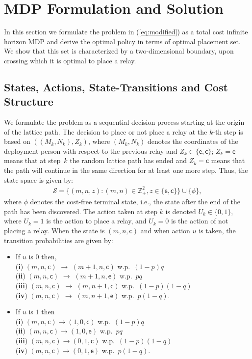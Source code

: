 \documentclass[conference]{IEEEtran}
\begin{document}
\section{MDP Formulation and Solution} 
\label{nlos_section}
In this section we formulate the problem in (\ref{eq:modified}) as a
total cost infinite horizon MDP and derive the optimal policy in terms
of optimal placement set. We show that this set is characterized by a
two-dimensional boundary, upon crossing which it is optimal to place
a relay.


\subsection{States, Actions, State-Transitions and Cost Structure} 
\label{NLOS_MDP}
We formulate the problem as a sequential decision process starting at
the origin of the lattice path. The decision to place or not place a
relay at the $k$-th step is based on $((M_k,N_k),Z_k)$, where
$(M_k,N_k)$ denotes the coordinates of the deployment person with
respect to the previous relay and $Z_k \in \{\mathsf{e},\mathsf{c}\}$;
$Z_k = \mathsf{e}$ means that at step~$k$ the random lattice path has
ended and $Z_k = \mathsf{c}$ means that the path will continue in the
same direction for at least one more step. Thus, the state space is
given by:
\begin{eqnarray}
\mathcal{S}=\Big\{(m,n,z): (m,n)\in \mathbb{Z}_+^2, z\in \{\mathsf{e},
\mathsf{c}\}\Big\}\cup\{\phi\},
\end{eqnarray}
where $\phi$ denotes the cost-free terminal state, i.e., the state
after the end of the path has been discovered. The action taken at
step $k$ is denoted $U_k\in\{0,1\}$, where $U_k=1$ is the action to
place a relay, and $U_k=0$ is the action of not placing a relay. When
the state is $(m,n,\mathsf{c})$ and when action $u$ is taken, the
transition probabilities are given by:
\begin {itemize}
\item If $u$ is $0$ then,\\
(\textbf{i})  $(m,n,\mathsf{c})$ $\longrightarrow$ $(m+1,n,\mathsf{c})$ w.p.\ $(1-p)q$\\
(\textbf{ii}) $(m,n,\mathsf{c})$ $\longrightarrow$ $(m+1,n,\mathsf{e})$  w.p.\ $pq$\\
(\textbf{iii}) $(m,n,\mathsf{c})$ $\longrightarrow$ $(m,n+1,\mathsf{c})$ w.p.\ $(1-p)(1-q)$\\
(\textbf{iv}) $(m,n,\mathsf{c})$ $\longrightarrow$ $(m,n+1,\mathsf{e})$ w.p.\ $p(1-q)$.

\item If $u$ is $1$ then\\
(\textbf{i}) $(m,n,\mathsf{c})\longrightarrow (1,0,\mathsf{c})$ w.p.\  $(1-p)q$\\
(\textbf{ii}) $(m,n,\mathsf{c})\longrightarrow (1,0,\mathsf{e})$ w.p.\  $pq$\\
(\textbf{iii}) $(m,n,\mathsf{c})\longrightarrow (0,1,\mathsf{c})$ w.p.\  $(1-p)(1-q)$\\
(\textbf{iv}) $(m,n,\mathsf{c})\longrightarrow (0,1,\mathsf{e})$ w.p.\  $p(1-q)$.
\end{itemize}
\end{document}
